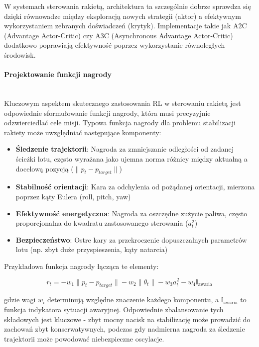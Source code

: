 W systemach sterowania rakietą, architektura ta szczególnie dobrze sprawdza się dzięki równowadze między eksploracją nowych strategii (aktor) a efektywnym wykorzystaniem zebranych doświadczeń (krytyk). Implementacje takie jak A2C (Advantage Actor-Critic) czy A3C (Asynchronous Advantage Actor-Critic) dodatkowo poprawiają efektywność poprzez wykorzystanie równoległych środowisk.

\paragraph{Projektowanie funkcji nagrody}\\
Kluczowym aspektem skutecznego zastosowania RL w sterowaniu rakietą jest odpowiednie sformułowanie funkcji nagrody, która musi precyzyjnie odzwierciedlać cele misji. Typowa funkcja nagrody dla problemu stabilizacji rakiety może uwzględniać następujące komponenty:

\begin{itemize}
    \item \textbf{Śledzenie trajektorii}: Nagroda za zmniejszanie odległości od zadanej ścieżki lotu, często wyrażana jako ujemna norma różnicy między aktualną a docelową pozycją ($\|p_t-p_{target}\|$)

    \item \textbf{Stabilność orientacji}: Kara za odchylenia od pożądanej orientacji, mierzona poprzez kąty Eulera (roll, pitch, yaw)

    \item \textbf{Efektywność energetyczna}: Nagroda za oszczędne zużycie paliwa, często proporcjonalna do kwadratu zastosowanego sterowania ($a_t^2$)

    \item \textbf{Bezpieczeństwo}: Ostre kary za przekroczenie dopuszczalnych parametrów lotu (np. zbyt duże przyspieszenia, kąty natarcia)
\end{itemize}

Przykładowa funkcja nagrody łącząca te elementy:

\begin{equation}
    r_t = -w_1\|p_t-p_{target}\| - w_2\|\theta_t\| - w_3 a_t^2 - w_4 \mathbb{I}_{\text{awaria}}
    \label{eq:reward_function}
\end{equation}

gdzie wagi $w_i$ determinują względne znaczenie każdego komponentu, a $\mathbb{I}_{\text{awaria}}$ to funkcja indykatora sytuacji awaryjnej. Odpowiednie zbalansowanie tych składowych jest kluczowe - zbyt mocny nacisk na stabilizację może prowadzić do zachowań zbyt konserwatywnych, podczas gdy nadmierna nagroda za śledzenie trajektorii może powodować niebezpieczne oscylacje.

